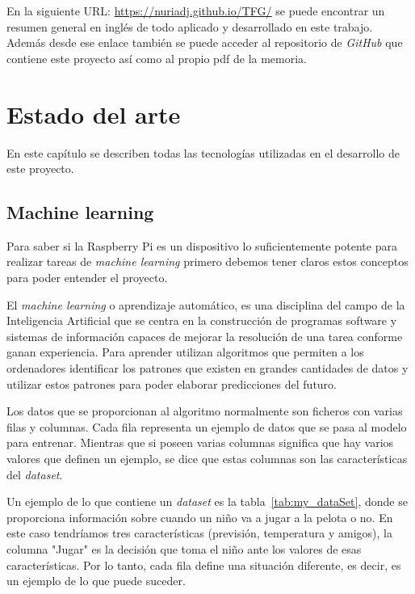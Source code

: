 \documentclass[a4paper, 12pt]{book}
\begin{document}
En la siguiente URL:  \url{https://nuriadj.github.io/TFG/} se puede encontrar un resumen general en inglés de todo aplicado y desarrollado en este trabajo. Además desde ese enlace también se puede acceder al repositorio de \textit{GitHub} que contiene este proyecto así como al propio pdf de la memoria.

\cleardoublepage


\chapter{Estado del arte}               %
\label{chap:tecnologias}

En este capítulo se describen todas las tecnologías utilizadas en el desarrollo de este proyecto.

\section{Machine learning}
\label{sec:machine_learning}

Para saber si la Raspberry Pi es un dispositivo lo suficientemente potente para realizar tareas de \textit{machine learning} primero debemos tener claros estos conceptos para poder entender el proyecto.

 El \textit{machine learning} o aprendizaje automático, es una disciplina del campo de la Inteligencia Artificial que se centra en la construcción de programas software y sistemas de información capaces de mejorar la resolución de una tarea conforme ganan experiencia. Para aprender utilizan algoritmos que permiten a los ordenadores identificar los patrones que existen en grandes cantidades de datos y utilizar estos patrones para poder elaborar predicciones del futuro. 
 
 Los datos que se proporcionan al algoritmo normalmente son ficheros con varias filas y columnas. Cada fila representa un ejemplo de datos que se pasa al modelo para entrenar. Mientras que si poseen varias columnas significa que hay varios valores que definen un ejemplo, se dice que estas columnas son las características del \textit{dataset}. 
 
 Un ejemplo de lo que contiene un \textit{dataset} es la tabla~\ref{tab:my_dataSet}, donde se proporciona información sobre cuando un niño va a jugar a la pelota o no. En este caso tendríamos tres características (previsión, temperatura y amigos), la columna "Jugar" es la decisión que toma el niño ante los valores de esas características. Por lo tanto, cada fila define una situación diferente, es decir, es un ejemplo de lo que puede suceder.
 
\end{document}
